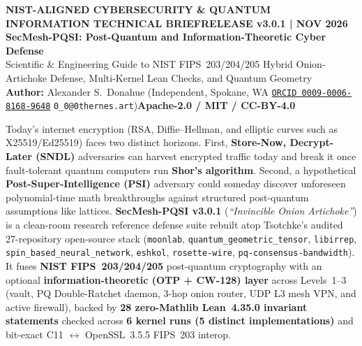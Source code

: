 \documentclass[10pt,letterpaper]{article}
\newcommand{\code}[1]{\texttt{\fontsize{7.8pt}{9.2pt}\selectfont #1}}
\begin{document}
\fontsize{8.35pt}{10.1pt}\selectfont
\thispagestyle{empty}

\vspace*{-0.16in}
\begin{tcolorbox}[colback=nistnavy, colframe=nistnavy, arc=3pt, left=8pt, right=8pt, top=6.5pt, bottom=6.5pt, boxrule=0pt]
  {\fontsize{7.2pt}{8.5pt}\selectfont\color{cyan!30}\textbf{NIST-ALIGNED CYBERSECURITY \& QUANTUM INFORMATION TECHNICAL BRIEF}\hfill\textbf{RELEASE v3.0.1 \;|\; NOV 2026}}\\[2.5pt]
  {\fontsize{13.8pt}{15.8pt}\selectfont\bfseries\color{white}SecMesh-PQSI: Post-Quantum and Information-Theoretic Cyber Defense}\\[2pt]
  {\fontsize{7.8pt}{9.4pt}\selectfont\color{white!90}Scientific \& Engineering Guide to NIST FIPS~203/204/205 Hybrid Onion-Artichoke Defense, Multi-Kernel Lean Checks, and Quantum Geometry}\\[3pt]
  {\fontsize{6.3pt}{7.6pt}\selectfont\color{cyan!20}\textbf{Author:} Alexander S.\ Donahue (Independent, Spokane, WA \;\textbullet\; \href{https://orcid.org/0009-0006-8168-9648}{\color{cyan!20}\texttt{ORCID 0009-0006-8168-9648}} \;\textbullet\; \texttt{0\_0@0thernes.art})\hfill\textbf{Apache-2.0 / MIT / CC-BY-4.0}}
\end{tcolorbox}
\vspace{1pt}

\begin{tcolorbox}[briefbox, title={Executive Summary --- What We Built and Why It Matters}]
Today's internet encryption (RSA, Diffie--Hellman, and elliptic curves such as X25519/Ed25519) faces two distinct horizons. First, \textbf{Store-Now, Decrypt-Later (SNDL)} adversaries can harvest encrypted traffic today and break it once fault-tolerant quantum computers run \textbf{Shor's algorithm}. Second, a hypothetical \textbf{Post-Super-Intelligence (PSI)} adversary could someday discover unforeseen polynomial-time math breakthroughs against structured post-quantum assumptions like lattices.
\textbf{SecMesh-PQSI v3.0.1} (\emph{``Invincible Onion Artichoke''}) is a clean-room research reference defense suite rebuilt atop Tsotchke's audited 27-repository open-source stack (\code{moonlab}, \code{quantum\_geometric\_tensor}, \code{libirrep}, \code{spin\_based\_neural\_network}, \code{eshkol}, \code{rosette-wire}, \code{pq-consensus-bandwidth}). It fuses \textbf{NIST FIPS~203/204/205} post-quantum cryptography with an optional \textbf{information-theoretic (OTP + CW-128) layer} across Levels~1--3 (vault, PQ Double-Ratchet daemon, 3-hop onion router, UDP L3 mesh VPN, and active firewall), backed by \textbf{28 zero-Mathlib Lean~4.35.0 invariant statements} checked across \textbf{6 kernel runs (5 distinct implementations)} and bit-exact C11 $\leftrightarrow$ OpenSSL~3.5.5 FIPS~203 interop.
\end{tcolorbox}
\end{document}
